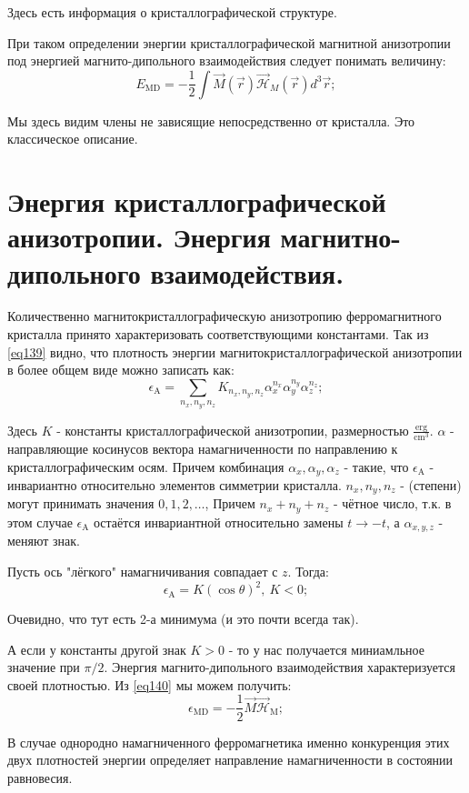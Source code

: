 \documentclass[a4paper, 14pt, russian]{article}
\newcommand{\be}{\begin{equation}}
\newcommand{\ee}{\end{equation}}
\begin{document}
	Здесь есть информация о кристаллографической структуре. 

	При таком определении энергии кристаллографической магнитной анизотропии 
	под энергией магнито-дипольного взаимодействия следует понимать
	величину:
	\be
		\label{eq140}
		E_\text{MD} = - \frac{1}{2} \int \vec{M}(\vec r) 
			\vec{\mathcal H}_{M} (\vec r) d^3 \vec r;
	\ee

	Мы здесь видим члены не зависящие непосредственно от кристалла. Это классическое
	описание.


	\section{Энергия кристаллографической анизотропии. Энергия магнитно-дипольного взаимодействия.}

	Количественно магнитокристаллографическую анизотропию ферромагнитного кристалла принято 
	характеризовать соответствующими константами. Так из  \ref{eq139} видно, что
	плотность энергии магнитокристаллографической анизотропии в более общем виде 
	можно записать как:
	\be
		\label{eq141}
		\epsilon_\text{A} = \sum_{n_x,n_y,n_z} K_{n_x,n_y,n_z} 
			\alpha_x^{n_x} \alpha_y^{n_y} \alpha_z^{n_z};
	\ee

	Здесь $K$ - константы кристаллографической анизотропии, размерностью
	$\frac{\text{erg}}{\text{cm}^3}$. $\alpha$ - направляющие
	косинусов вектора намагниченности по направлению к кристаллографическим осям. 
	Причем комбинация $\alpha_{x},\alpha_{y}, \alpha_{z}$ - такие, что
	$\epsilon_\text{A}$ - инвариантно относительно элементов симметрии кристалла.
	$n_x,n_y,n_z$ - (степени) могут принимать значения $0,1,2,\hdots$, Причем
	$n_x + n_y + n_z$ -  чётное число, т.к. в этом случае $\epsilon_\text{A}$
	остаётся инвариантной относительно замены $t \rightarrow - t$, а 
	$\alpha_{x,y,z}$ -  меняют знак. 

	Пусть ось "лёгкого"  намагничивания совпадает с $z$. Тогда:
	\be
		\epsilon_\text{A} = K (\cos \theta)^2,~K < 0;
	\ee

	Очевидно, что тут есть 2-а минимума (и это почти всегда так).

	А если у константы другой знак $K > 0$ - то у нас получается
	миниамльное значение при $\pi/ 2$. Энергия магнито-дипольного
	взаимодействия характеризуется своей плотностью. Из \ref{eq140}
	мы можем получить:
	\be
		\label{eq142}
		\epsilon_\text{MD} = - \frac{1}{2} \vec M \vec{\mathcal H}_\text{M};
	\ee


	В случае однородно намагниченного ферромагнетика именно конкуренция этих двух
	плотностей энергии определяет направление намагниченности в состоянии 
	равновесия. 
	
\end{document}
